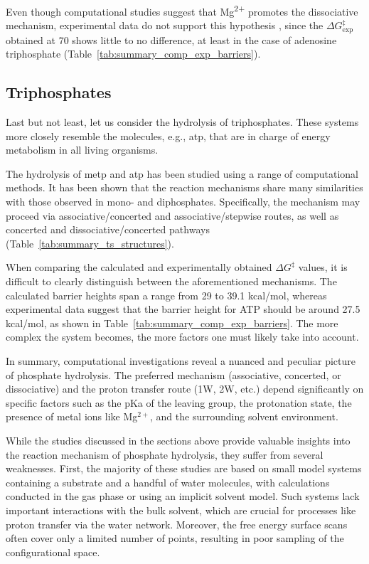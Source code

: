 Even though computational studies suggest that Mg\textsuperscript{2+} promotes the dissociative mechanism, experimental data do not support this hypothesis \citep{ramirezMagnesiumCalciumIon1980}, since the $\Delta G^{\ddagger}_{\text{exp}}$ obtained at 70 shows little to no difference, at least in the case of adenosine triphosphate (Table~\ref{tab:summary_comp_exp_barriers}).



\subsection{Triphosphates}
Last but not least, let us consider the hydrolysis of triphosphates. These systems more closely resemble the molecules, e.g., \ac{atp}, that are in charge of energy metabolism in all living organisms.

The hydrolysis of \ac{metp} and \ac{atp} has been studied using a range of computational methods. It has been shown that the reaction mechanisms share many similarities with those observed in mono- and diphosphates. Specifically, the mechanism may proceed via associative/concerted and associative/stepwise routes, as well as concerted and dissociative/concerted pathways (Table~\ref{tab:summary_ts_structures}). 

When comparing the calculated and experimentally obtained $\Delta G^{\ddagger}$ values, it is difficult to clearly distinguish between the aforementioned mechanisms. The calculated barrier heights span a range from 29 to 39.1 kcal/mol, whereas experimental data suggest that the barrier height for ATP should be around 27.5 kcal/mol, as shown in Table~\ref{tab:summary_comp_exp_barriers}. The more complex the system becomes, the more factors one must likely take into account.

In summary, computational investigations reveal a nuanced and peculiar picture of phosphate hydrolysis. The preferred mechanism (associative, concerted, or dissociative) and the proton transfer route (1W, 2W, etc.) depend significantly on specific factors such as the pKa of the leaving group, the protonation state, the presence of metal ions like Mg$^{2+}$, and the surrounding solvent environment.

While the studies discussed in the sections above provide valuable insights into the reaction mechanism of phosphate hydrolysis, they suffer from several weaknesses. First, the majority of these studies are based on small model systems containing a substrate and a handful of water molecules, with calculations conducted in the gas phase or using an implicit solvent model. Such systems lack important interactions with the bulk solvent, which are crucial for processes like proton transfer via the water network. Moreover, the free energy surface scans often cover only a limited number of points, resulting in poor sampling of the configurational space.

